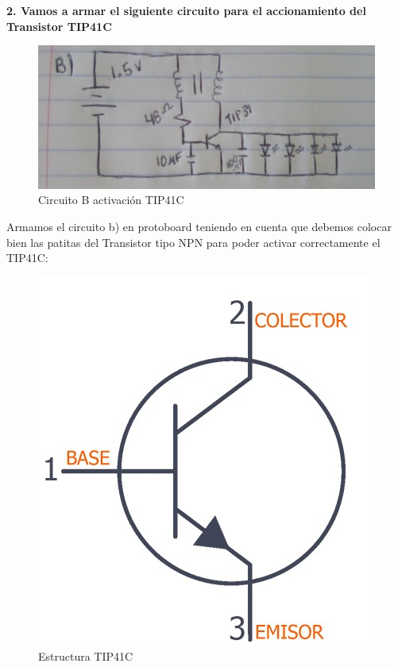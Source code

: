 \documentclass[10pt,a4paper]{article}
\begin{document}
\newpage
\textbf{2. Vamos a armar el siguiente circuito para el accionamiento del Transistor TIP41C}

\begin{figure}[hbtp]
\centering
\includegraphics[scale=0.3]{Pictures/Circuito B.jpeg}
\caption{Circuito B activación TIP41C}
\end{figure}

Armamos el circuito b) en protoboard teniendo en cuenta que debemos colocar bien las patitas del Transistor tipo NPN para poder activar correctamente el TIP41C:
\begin{figure}[hbtp]
\centering
\includegraphics[scale=0.5]{Pictures/TIP41C.jpg}
\caption{Estructura TIP41C}
\end{figure}
\end{document}
